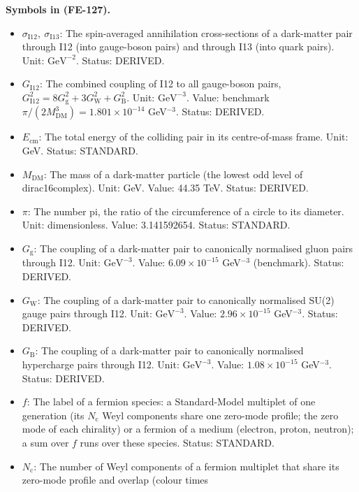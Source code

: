 \documentclass[
  10pt,
]{article}
\providecommand{\tightlist}{%
  \setlength{\itemsep}{0pt}\setlength{\parskip}{0pt}}
\begin{document}
\textbf{Symbols in (FE-127).}

\begin{itemize}
\tightlist
\item
  \(\sigma_{\mathrm{I12}},\ \sigma_{\mathrm{I13}}\): The spin-averaged
  annihilation cross-sections of a dark-matter pair through I12 (into
  gauge-boson pairs) and through I13 (into quark pairs). Unit:
  \(\mathrm{GeV}^{-2}\). Status: DERIVED.
\item
  \(G_{\mathrm{I12}}\): The combined coupling of I12 to all gauge-boson
  pairs,
  \(G_{\mathrm{I12}}^2 = 8G_{\mathrm{g}}^2 + 3G_{\mathrm{W}}^2 + G_{\mathrm{B}}^2\).
  Unit: \(\mathrm{GeV}^{-3}\). Value: benchmark
  \(\pi/(2M_{\mathrm{DM}}^3) = 1.801\times10^{-14}\) GeV\(^{-3}\).
  Status: DERIVED.
\item
  \(E_{\mathrm{cm}}\): The total energy of the colliding pair in its
  centre-of-mass frame. Unit: GeV. Status: STANDARD.
\item
  \(M_{\mathrm{DM}}\): The mass of a dark-matter particle (the lowest
  odd level of dirac16complex). Unit: GeV. Value: 44.35 TeV. Status:
  DERIVED.
\item
  \(\pi\): The number pi, the ratio of the circumference of a circle to
  its diameter. Unit: dimensionless. Value: 3.141592654. Status:
  STANDARD.
\item
  \(G_{\mathrm{g}}\): The coupling of a dark-matter pair to canonically
  normalised gluon pairs through I12. Unit: \(\mathrm{GeV}^{-3}\).
  Value: \(6.09\times10^{-15}\) GeV\(^{-3}\) (benchmark). Status:
  DERIVED.
\item
  \(G_{\mathrm{W}}\): The coupling of a dark-matter pair to canonically
  normalised SU(2) gauge pairs through I12. Unit: \(\mathrm{GeV}^{-3}\).
  Value: \(2.96\times10^{-15}\) GeV\(^{-3}\). Status: DERIVED.
\item
  \(G_{\mathrm{B}}\): The coupling of a dark-matter pair to canonically
  normalised hypercharge pairs through I12. Unit: \(\mathrm{GeV}^{-3}\).
  Value: \(1.08\times10^{-15}\) GeV\(^{-3}\). Status: DERIVED.
\item
  \(f\): The label of a fermion species: a Standard-Model multiplet of
  one generation (its \(N_{\mathrm{c}}\) Weyl components share one
  zero-mode profile; the zero mode of each chirality) or a fermion of a
  medium (electron, proton, neutron); a sum over \(f\) runs over these
  species. Status: STANDARD.
\item
  \(N_{\mathrm{c}}\): The number of Weyl components of a fermion
  multiplet that share its zero-mode profile and overlap (colour times

\end{itemize}
\end{document}
